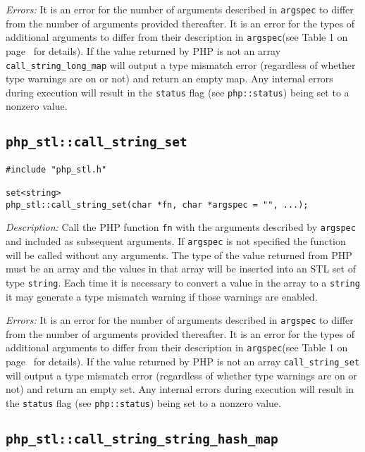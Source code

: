 \documentclass[11pt,titlepage]{article}
\begin{document}
\emph{Errors:} It is an error for the number of arguments described in \verb|argspec| to differ from the number of arguments provided thereafter. It is an error for the types of additional arguments to differ from their description in \verb|argspec|(see Table 1 on page~\pageref{Table1} for details). If the value returned by PHP is not an array \verb|call_string_long_map| will output a type mismatch error (regardless of whether type warnings are on or not) and return an empty map. Any internal errors during execution will result in the \verb|status| flag (see \verb|php::status|) being set to a nonzero value.


\subsection{\texttt{php\_stl::call\_string\_set}}

\begin{verbatim}
#include "php_stl.h"

set<string> 
php_stl::call_string_set(char *fn, char *argspec = "", ...);
\end{verbatim}

\emph{Description:} Call the PHP function \verb|fn| with the arguments described by \verb|argspec| and included as subsequent arguments. If \verb|argspec| is not specified the function will be called without any arguments. The type of the value returned from PHP must be an array and the values in that array will be inserted into an STL set of type \verb|string|. Each time it is necessary to convert a value in the array to a \verb|string| it may generate a type mismatch warning if those warnings are enabled.

\emph{Errors:} It is an error for the number of arguments described in \verb|argspec| to differ from the number of arguments provided thereafter. It is an error for the types of additional arguments to differ from their description in \verb|argspec|(see Table 1 on page~\pageref{Table1} for details). If the value returned by PHP is not an array \verb|call_string_set| will output a type mismatch error (regardless of whether type warnings are on or not) and return an empty set. Any internal errors during execution will result in the \verb|status| flag (see \verb|php::status|) being set to a nonzero value.


\subsection{\texttt{php\_stl::call\_string\_string\_hash\_map}}
\end{document}
